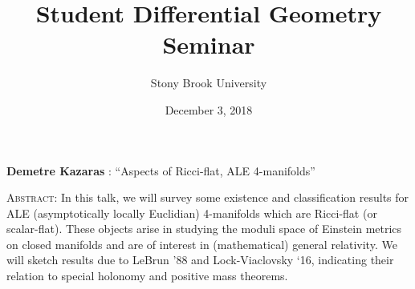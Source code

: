 \documentclass[11pt]{article}
\title{Student Differential Geometry Seminar}
\author{Stony Brook University}
\date{December 3, 2018}
\makeatletter
\newcommand{\spe@ker}{}
\newcommand{\t@lktitle}{}
\newcommand{\@ffili@tion}{}
\newcommand{\speaker}[1]{%
  \renewcommand{\spe@ker}{#1}}
\newcommand{\talktitle}[1]{%
  \renewcommand{\t@lktitle}{#1}}
\newcommand{\affiliation}[1]{%
  \renewcommand{\@ffili@tion}{#1}}
\renewenvironment{abstract}{%
  \begin{center}
    \large
    \textbf{\spe@ker} %
    : ``\t@lktitle''
  \end{center}
  \begin{trivlist}
  \item\textsc{Abstract:}}{%
  \end{trivlist}}
\makeatother
\begin{document}
\maketitle
\thispagestyle{empty}

\speaker{Demetre Kazaras}
\talktitle{Aspects of Ricci-flat, ALE 4-manifolds}

\begin{abstract}
In this talk, we will survey some existence and classification results for ALE (asymptotically locally Euclidian) 4-manifolds which are Ricci-flat (or scalar-flat). These objects arise in studying the moduli space of Einstein metrics on closed manifolds and are of interest in (mathematical) general relativity. We will sketch results due to LeBrun ’88 and Lock-Viaclovsky ‘16, indicating their relation to special holonomy and positive mass theorems.
\end{abstract}
\end{document}
